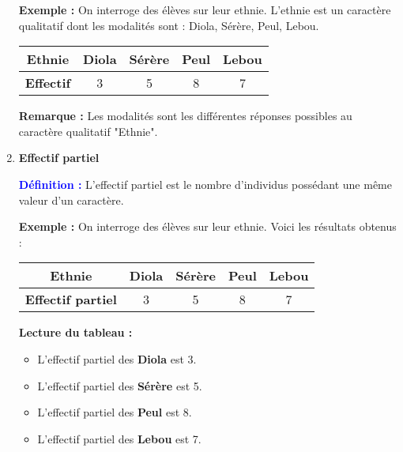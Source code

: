 \documentclass[a4paper,12pt]{article}
\begin{document}
\begin{enumerate}[leftmargin=1.5cm, label=\textbf{\arabic*)}]
\textbf{Exemple :} On interroge des élèves sur leur ethnie. L'ethnie est un caractère qualitatif dont les modalités sont : Diola, Sérère, Peul, Lebou.

\vspace{0.3cm}
\begin{center}
\begin{tabular}{|c|c|c|c|c|}
    \hline
    \textbf{Ethnie} & Diola & Sérère & Peul & Lebou \\
    \hline
    \textbf{Effectif} & 3 & 5 & 8 & 7 \\
    \hline
\end{tabular}
\end{center}

\vspace{0.3cm}
\begin{tcolorbox}[colback=blue!5!white, colframe=blue!60!black, boxrule=0.5pt]
\textbf{Remarque :} Les modalités sont les différentes réponses possibles au caractère qualitatif "Ethnie".
\end{tcolorbox}

\item \textbf{Effectif partiel} \\

\begin{tcolorbox}[colback=red!5!white, colframe=red!60!black, boxrule=0.5pt]
    \textcolor{blue}{\textbf{Définition :}} 
    L'effectif partiel est le nombre d'individus possédant une même valeur d’un caractère.
\end{tcolorbox}

\vspace{0.2cm}

\textbf{Exemple :} On interroge des élèves sur leur ethnie. Voici les résultats obtenus :

\vspace{0.3cm}
\begin{center}
\begin{tabular}{|c|c|c|c|c|}
    \hline
    \textbf{Ethnie} & Diola & Sérère & Peul & Lebou \\
    \hline
    \textbf{Effectif partiel} & 3 & 5 & 8 & 7 \\
    \hline
\end{tabular}
\end{center}

\vspace{0.4cm}

\begin{tcolorbox}[colback=blue!5!white, colframe=blue!60!black, boxrule=0.5pt]
\textbf{Lecture du tableau :}
\begin{itemize}
    \item L’effectif partiel des \textbf{Diola} est 3.
    \item L’effectif partiel des \textbf{Sérère} est 5.
    \item L’effectif partiel des \textbf{Peul} est 8.
    \item L’effectif partiel des \textbf{Lebou} est 7.
\end{itemize}
\end{tcolorbox}


\end{enumerate}
\end{document}
